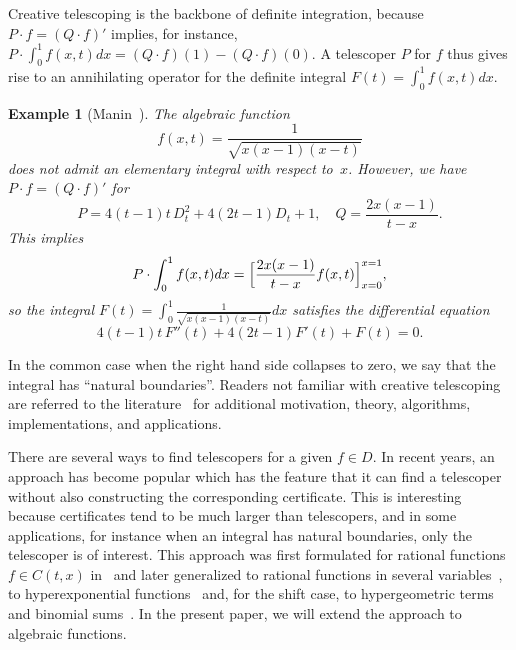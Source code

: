 \documentclass{sig-alternate-05-2015}
\newtheorem{example}[theorem]{Example}
\begin{document}
Creative telescoping is the backbone of definite integration, because
$P\cdot f=(Q\cdot f)'$ implies, for instance, $P\cdot\int_0^1 f(x,t)dx = (Q\cdot f)(1) - (Q\cdot f)(0)$.
A telescoper $P$ for $f$ thus gives rise to an annihilating operator for the
definite integral $F(t)=\int_0^1 f(x,t)dx$.
\begin{example}[Manin~\cite{manin1958}]
  The algebraic function
  \[ f(x,t)=\frac1{\sqrt{x(x-1)(x-t)}}\]
  does not admit an elementary integral with respect to~$x$.
  However, we have $P\cdot f=(Q\cdot f)'$ for
  \[
    P=4(t-1)t\,D_t^2 + 4(2t-1)D_t+1,\quad Q=\frac{2x(x-1)}{t-x}.
  \]
  This implies
  \[
    P\cdot \int_0^1 f(x,t)dx = \Bigl[\frac{2x(x-1)}{t-x}f(x,t)\Bigr]_{x=0}^{x=1},
  \]
  so the integral $F(t)=\int_0^1\frac1{\sqrt{x(x-1)(x-t)}}dx$ satisfies the differential equation
  \[
    4(t-1)t\,F''(t) + 4(2t-1)F'(t) + F(t) = 0.
  \]
\end{example}
In the common case when the right hand side
collapses to zero, we say that the integral has ``natural boundaries''.
Readers not familiar with creative telescoping are referred to the
literature~\cite{PWZbook1996,Zeilberger1990c,Zeilberger1991,Zeilberger1990,Koepf1998,kauers11}
for additional motivation, theory, algorithms, implementations, and applications.

There are several ways to find telescopers for a given $f\in D$. In recent
years, an approach has become popular which has the feature that it can find a
telescoper without also constructing the corresponding certificate. This is
interesting because certificates tend to be much larger than telescopers, and in
some applications, for instance when an integral has natural boundaries, only the
telescoper is of interest. This approach was first formulated for rational
functions $f\in C(t,x)$ in~\cite{BCCL2010} and later generalized to rational
functions in several variables~\cite{bostan13, lairez15}, to hyperexponential
functions~\cite{bostan13a} and, for the shift case, to hypergeometric
terms~\cite{chen15a,huang16} and binomial sums~\cite{bostan15}. In the present paper, we
will extend the approach to algebraic functions.
\end{document}
